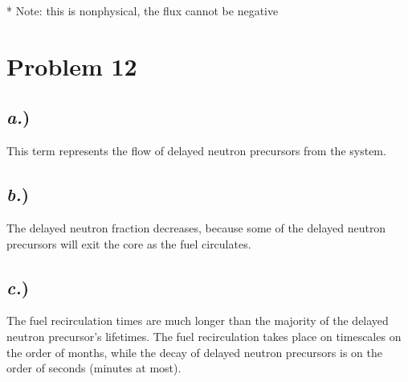 \documentclass{article}
\begin{document}
* Note: this is nonphysical, the flux cannot be negative




\section*{Problem 12}

\subsection*{\textit{a.})} This term represents the flow of delayed neutron precursors from the system.

\subsection*{\textit{b.})} The delayed neutron fraction decreases, because some of the delayed neutron precursors will exit the core as the fuel circulates.

\subsection*{\textit{c.})} The fuel recirculation times are much longer than the majority of the delayed neutron precursor's lifetimes. The fuel recirculation takes place on timescales on the order of months, while the decay of delayed neutron precursors is on the order of seconds (minutes at most).




\end{document}
